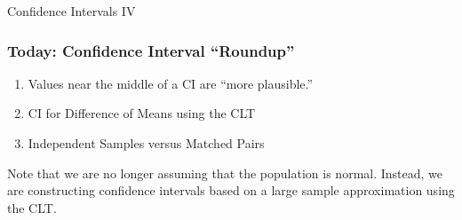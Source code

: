 \documentclass[handout]{beamer}
\date{Lecture 18}
\begin{document}
 





\begin{frame}[plain]
	\titlepage 
	

\end{frame} 



\begin{frame}
\begin{center}
\Huge Confidence Intervals IV
\end{center}
\end{frame}

\begin{frame}
\frametitle{Today: Confidence Interval ``Roundup''}

\begin{enumerate}
	\item Values near the middle of a CI are ``more plausible.''
	\item CI for Difference of Means using the CLT
	\item Independent Samples versus Matched Pairs
\end{enumerate}

\alert{Note that we are no longer assuming that the population is normal. Instead, we are constructing confidence intervals based on a large sample approximation using the CLT.}

\end{frame}
\end{document}
